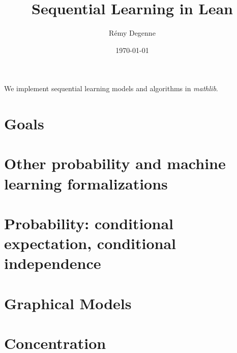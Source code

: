 \documentclass{article}
\title{Sequential Learning in Lean}
\author{Rémy Degenne}
\date{\today}
\begin{document}
\maketitle

We implement sequential learning models and algorithms in \emph{mathlib}.

\section{Goals}



\section{Other probability and machine learning formalizations}
\label{sec:other_probability_and_machine_learning_formalizations}



\section{Probability: conditional expectation, conditional independence}
\label{sec:conditional_independence}



\section{Graphical Models}
\label{sec:graphical_models}



\section{Concentration}
\label{sec:concentration}








\end{document}
